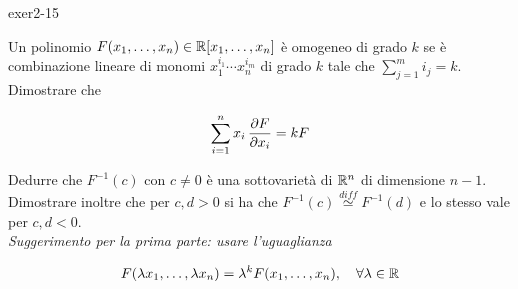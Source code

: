 {exer2-15}
{
Un polinomio $ F(x_{1},\dots,x_{n}) \in \mathbb{R}[x_{1},\dots,x_{n}] $ è omogeneo di grado $ k $ se è combinazione lineare di monomi $ x_{1}^{i_{1}} \cdots x_{n}^{i_{m}} $ di grado $ k $ tale che $ \sum_{j=1}^{m} i_{j} = k $. Dimostrare che

\begin{equation}
	\sum_{i=1}^{n} x_{i} \, \pdv{F}{x_{i}} = k F
\end{equation}

Dedurre che $ F^{-1}(c) $ con $ c \neq 0 $ è una sottovarietà di $ \mathbb{R}^{n} $ di dimensione $ n-1 $. Dimostrare inoltre che per $ c,d>0 $ si ha che $ F^{-1}(c) \stackrel{diff}{\simeq} F^{-1}(d) $ e lo stesso vale per $ c,d<0 $. \\
\textit{Suggerimento per la prima parte: usare l'uguaglianza}

\begin{equation}
	F(\lambda x_{1},\dots,\lambda x_{n}) = \lambda^{k} F(x_{1},\dots,x_{n}) %
	\qcomma \forall \lambda \in \R
\end{equation}
}
